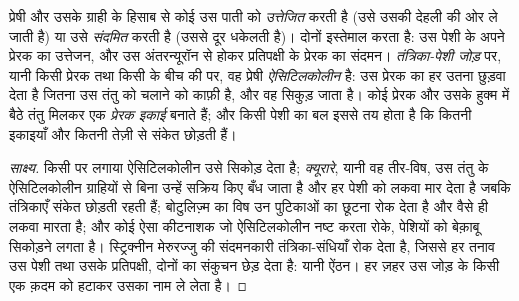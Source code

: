 \begin{proposition}[उत्तेजन, संदमन, और पेशी का जोड़]\label{prop:g12:stretch-reflex:junction}
प्रेषी और उसके ग्राही के हिसाब से कोई  उस पाती  को
\emph{उत्तेजित} करती है (उसे उसकी देहली की ओर ले जाती है) या उसे
\emph{संदमित} करती है (उससे दूर धकेलती है)।  दोनों इस्तेमाल
करता है: उस पेशी के अपने प्रेरक  का उत्तेजन, और उस अंतरन्यूरॉन से
होकर प्रतिपक्षी के प्रेरक  का संदमन। \emph{तंत्रिका-पेशी जोड़} पर,
यानी किसी प्रेरक  तथा किसी  के बीच की  पर, वह
प्रेषी \emph{ऐसिटिलकोलीन} है: उस प्रेरक  का हर  उतना
छुड़वा देता है जितना उस तंतु को चलाने को काफ़ी है, और वह सिकुड़ जाता है। कोई
प्रेरक  और उसके हुक्म में बैठे तंतु मिलकर एक \emph{प्रेरक इकाई} बनाते
हैं; और किसी पेशी का बल इससे तय होता है कि कितनी इकाइयाँ और कितनी तेज़ी से
संकेत छोड़ती हैं।
\end{proposition}
\begin{proof}[साक्ष्य]
किसी  पर लगाया ऐसिटिलकोलीन उसे सिकोड़ देता है; \emph{क्यूरारे},
यानी वह तीर-विष, उस तंतु के ऐसिटिलकोलीन ग्राहियों से बिना उन्हें सक्रिय किए
बँध जाता है और हर पेशी को लकवा मार देता है जबकि तंत्रिकाएँ संकेत छोड़ती रहती
हैं; बोटुलिज़्म का विष उन पुटिकाओं का छूटना रोक देता है और वैसे ही लकवा
मारता है; और कोई ऐसा कीटनाशक जो ऐसिटिलकोलीन नष्ट करता  रोके, पेशियों
को बेक़ाबू सिकोड़ने लगता है। स्ट्रिक्नीन मेरुरज्जु की संदमनकारी
तंत्रिका-संधियाँ रोक देता है, जिससे हर तनाव उस पेशी तथा उसके प्रतिपक्षी,
दोनों का संकुचन छेड़ देता है: यानी ऐंठन। हर ज़हर उस जोड़ के किसी एक क़दम को
हटाकर उसका नाम ले लेता है।
\end{proof}

